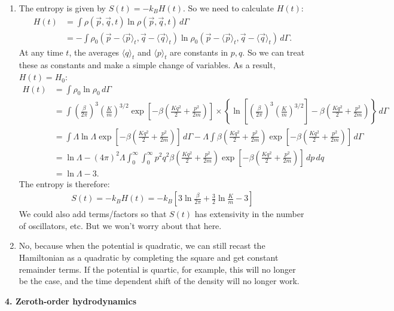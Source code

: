 \documentclass{article}
\theoremstyle{definition}
\newcommand{\be}{\beta}
\newcommand{\f}[2]{\frac{#1}{#2}}
\newcommand{\lp}{\left(}
\newcommand{\rp}{\right)}
\newcommand{\lb}{\left[}
\newcommand{\rb}{\right]}
\newcommand{\lc}{\left\{}
\newcommand{\rc}{\right\}}
\begin{document}
\begin{enumerate}[label=(\alph*)]
	\item The entropy is given by $S(t) = -k_BH(t)$. So we need to calculate $H(t)$:
	\begin{align*}
	H(t) &= \int \rho(\vec{p},\vec{q},t)\ln \rho(\vec{p},\vec{q},t) \,d\Gamma \\
	&= -\int \rho_0(\vec{p} - \langle \vec{p}\rangle_t, \vec{q} - \langle \vec{q}\rangle_t)\ln \rho_0(\vec{p} - \langle \vec{p}\rangle_t, \vec{q} - \langle \vec{q}\rangle_t)\,d\Gamma.
	\end{align*}
	At any time $t$, the averages $\langle q\rangle_t$ and $\langle p \rangle_t$ are constants in $p,q$. So we can treat these as constants and make a simple change of variables. As a result, $H(t) = H_0$:
	\begin{align*}
	H(t) 
	&= \int \rho_0 \ln \rho_0\,d\Gamma\\
	&= \int {\lp \f{\be}{2\pi} \rp^3 \lp \f{K}{m} \rp^{3/2}} \exp\lb -\be\lp \f{Kq^2}{2} + \f{p^2}{2m} \rp \rb \times \lc \ln \lb \lp \f{\be}{2\pi} \rp^3 \lp \f{K}{m} \rp^{3/2}\rb  -\be\lp \f{Kq^2}{2} + \f{p^2}{2m} \rp  \rc\,d\Gamma\\
	&= \int \Lambda\ln \Lambda \exp\lb -\be\lp \f{Kq^2}{2} + \f{p^2}{2m} \rp \rb \,d\Gamma - \Lambda\int \be\lp \f{Kq^2}{2} + \f{p^2}{2m} \rp \exp\lb -\be\lp \f{Kq^2}{2} + \f{p^2}{2m} \rp \rb \,d\Gamma \\
	&= \ln \Lambda - (4\pi)^2\Lambda \int_0^\infty \int_0^\infty p^2q^2\be\lp \f{Kq^2}{2} + \f{p^2}{2m} \rp \exp\lb -\be\lp \f{Kq^2}{2} + \f{p^2}{2m} \rp \rb \,dp\,dq\\
	&= \ln\Lambda - 3.
 	\end{align*} 
 	The entropy is therefore:
 	\begin{align*}
 	\boxed{S(t) = -k_B H(t) = -k_B \lb  3\ln \f{\be}{2\pi} + \f{3}{2}\ln \f{K}{m} - 3  \rb}
 	\end{align*}
	We could also add terms/factors so that $S(t)$ has extensivity in the number of oscillators, etc. But we won't worry about that here.
	
	
	\item $\boxed{\text{No}}$, because when the potential is quadratic, we can still recast the Hamiltonian as a quadratic by completing the square and get constant remainder terms. If the potential is quartic, for example, this will no longer be the case, and the time dependent shift of the density will no longer work. 
\end{enumerate}



\noindent \textbf{4. Zeroth-order hydrodynamics}
\end{document}
